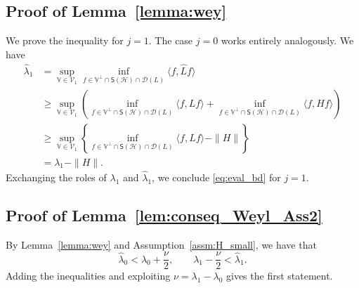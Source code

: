 \documentclass{aptpub}
\newcommand{\Dom}{\mathcal D}
\renewcommand{\H}{\mathcal H}
\begin{document}
\subsection{Proof of Lemma~\ref{lemma:wey}}
\label{app:weyl}
We prove the inequality for $j=1$. The case $j=0$ works entirely analogously. We have
    \begin{equation*}
        \begin{split}
            \widehat \lambda_1 &= \sup_{\mathbb V \in \mathcal V_1} \inf_{f\in \mathbb V^\perp \cap \mathsf S(\H)\cap \Dom(L)} \langle f, \widehat Lf\rangle\\
            &\ge \sup_{\mathbb V \in \mathcal V_1} \left( \inf_{f\in \mathbb V^\perp \cap \mathsf S(\H)\cap \Dom(L)} \langle f,Lf\rangle +  \inf_{f\in \mathbb V^\perp \cap \mathsf S(\H)\cap \Dom(L)} \langle f,Hf\rangle  \right)\\
            &\ge \sup_{\mathbb V \in \mathcal V_1} \left \{  \inf_{f\in \mathbb V^\perp \cap \mathsf S(\H)\cap \Dom(L)} \langle f,Lf\rangle - \|H\| \right \}\\
            &= \lambda_1 - \|H\| .
        \end{split}
    \end{equation*}
    Exchanging the roles of $\lambda_1$ and $\widehat\lambda_1$, we conclude \eqref{eq:eval_bd} for $j=1$. 

\subsection{Proof of Lemma~\ref{lem:conseq_Weyl_Ass2}}
\label{app:lambda0}
By Lemma~\ref{lemma:wey} and Assumption~\ref{assm:H_small}, we have that
	\[
		\widehat{\lambda}_0 < \lambda_0+\frac{\nu}{2}, \qquad
		\lambda_1-\frac{\nu}{2} < \widehat{\lambda}_1.
	\]
Adding the inequalities and exploiting $\nu = \lambda_1-\lambda_0$ gives the first statement.
\end{document}
